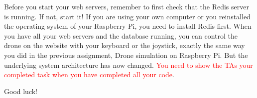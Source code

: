 \documentclass{article}
\begin{document}
Before you start your web servers, remember to first check that the Redis server is running. If not, start it! If you are using your own computer or you reinstalled the operating system of your Raspberry Pi, you need to install Redis first. When you have all your web servers and the database running, you can control the drone on the website with your keyboard or the joystick, exactly the same way you did in the previous assignment, Drone simulation on Raspberry Pi. But the underlying system architecture has now changed. {\textcolor{red}{You need to show the TAs your completed task when you have completed all your code}}.

\vspace{1cm}
\begin{center}
\huge Good luck!
\end{center}
\end{document}
